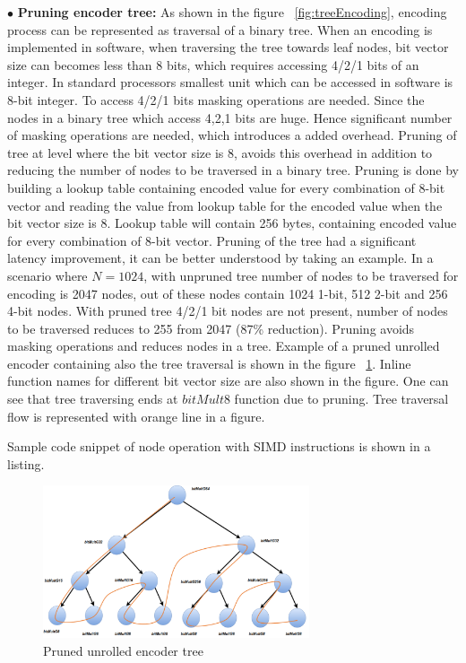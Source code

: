 $\bullet$ \textbf{Pruning encoder tree:} As shown in the figure ~\ref{fig:treeEncoding}, encoding process can be represented as traversal of a binary tree. When an encoding is implemented in software, when traversing the tree towards leaf nodes, bit vector size can becomes less than 8 bits, which requires accessing 4/2/1 bits of an integer. In standard processors smallest unit which can be accessed in software is 8-bit integer. To access 4/2/1 bits masking operations are needed. Since the nodes in a binary tree which access 4,2,1 bits are huge. Hence significant number of masking operations are needed, which introduces a added overhead. Pruning of tree at level where the bit vector size is 8, avoids this overhead in addition to reducing the number of nodes to be traversed in a binary tree. Pruning is done by building a lookup table containing encoded value for every combination of 8-bit vector and reading the value from lookup table for the encoded value when the bit vector size is 8. Lookup table will contain 256 bytes, containing encoded value for every combination of 8-bit vector.\newline
\newline
Pruning of the tree had a significant latency improvement, it can be better understood by taking an example. In a scenario where $N = 1024$, with unpruned tree number of nodes to be traversed for encoding is 2047 nodes, out of these nodes contain 1024 1-bit, 512 2-bit and 256 4-bit nodes. With pruned tree 4/2/1 bit nodes are not present, number of nodes to be traversed reduces to 255 from 2047 (87\% reduction). Pruning avoids masking operations and reduces nodes in a tree. \newline
\newline
Example of a pruned unrolled encoder containing also the tree traversal is shown in the figure ~\ref{fig:unrolledEncoder}. Inline function names for different bit vector size are also shown in the figure. One can see that tree traversing ends at $bitMult8$ function due to pruning. Tree traversal flow is represented with orange line in a figure.

Sample code snippet of node operation with SIMD instructions is shown in a listing.

\begin{figure}[!h]
	\centering
	\includegraphics[width=0.7\textwidth]{./figures/unrolledEncoder.pdf}
	\caption{Pruned unrolled encoder tree}
	\label{fig:unrolledEncoder}
\end{figure}

